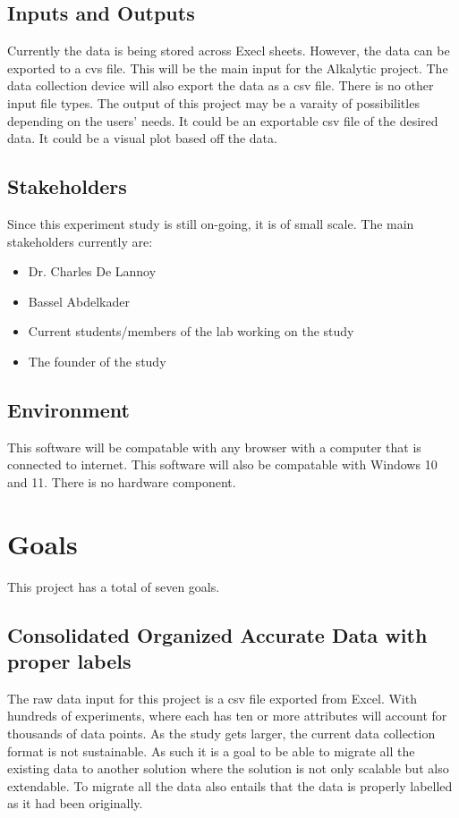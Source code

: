 \documentclass{article}
\begin{document}
\subsection{Inputs and Outputs}
Currently the data is being stored across Execl sheets. However, the data can be exported to a cvs file. This will be the main input for the Alkalytic project. 
The data collection device will also export the data as a csv file. There is no other input file types. 
\newline 
The output of this project may be a varaity of possibilitles depending on the users' needs. It could be an exportable csv file of the desired data. 
It could be a visual plot based off the data.  

\subsection{Stakeholders}
Since this experiment study is still on-going, it is of small scale. \newline 
The main stakeholders currently are:
\begin{itemize}
    \item Dr. Charles De Lannoy
    \item Bassel Abdelkader
    \item Current students/members of the lab working on the study 
    \item The founder of the study 
\end{itemize}

\subsection{Environment}
This software will be compatable with any browser with a computer that is connected to internet. 
This software will also be compatable with Windows 10 and 11. There is no hardware component. 

\section{Goals}
This project has a total of seven goals.
\subsection*{Consolidated Organized Accurate Data with proper labels}
The raw data input for this project is a csv file exported from Excel. With hundreds of experiments,
where each has ten or more attributes will account for thousands of data points. As the study gets larger, the current data collection format is not sustainable.
As such it is a goal to be able to migrate all the existing data to another solution where the solution is not only scalable but also extendable.
To migrate all the data also entails that the data is properly labelled as it had been originally.
\end{document}
